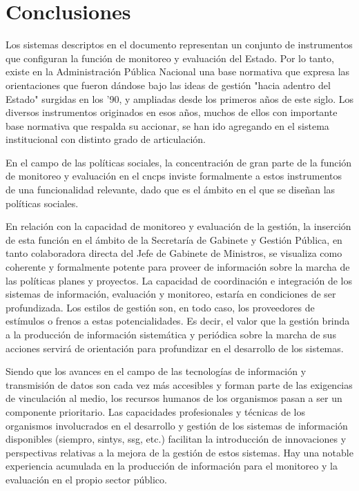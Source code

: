 \newpage
\section{Conclusiones} \label{conclusiones}

Los sistemas descriptos en el documento representan un conjunto de instrumentos que configuran la función de monitoreo y evaluación del Estado. Por lo tanto, existe en la Administración Pública Nacional una base normativa que expresa las orientaciones que fueron dándose bajo las ideas de gestión "hacia adentro del Estado" surgidas en los '90, y ampliadas desde los primeros años de este siglo. Los diversos instrumentos originados en esos años, muchos de ellos con importante base normativa que respalda su accionar, se han ido agregando en el sistema institucional con distinto grado de articulación.

En el campo de las políticas sociales, la concentración de gran parte de la función de monitoreo y evaluación en el \ac{cncps} inviste formalmente a estos instrumentos de una funcionalidad relevante, dado que es el ámbito en el que se diseñan las políticas sociales. 

En relación con la capacidad de monitoreo y evaluación de la gestión, la inserción de esta función en el ámbito de la Secretaría de Gabinete y Gestión Pública, en tanto colaboradora directa del Jefe de Gabinete de Ministros, se visualiza como coherente y formalmente potente para proveer de información sobre la marcha de las políticas planes y proyectos.
La capacidad de coordinación e integración de los sistemas de información, evaluación y monitoreo, estaría en condiciones de ser profundizada. Los estilos de gestión son, en todo caso, los proveedores de estímulos o frenos a estas potencialidades. Es decir, el valor que la gestión brinda a la producción de información sistemática y periódica sobre la marcha de sus acciones servirá de orientación para profundizar en el desarrollo de los sistemas.

Siendo que los avances en el campo de las tecnologías de información y transmisión de datos son cada vez más accesibles y forman parte de las exigencias de vinculación al medio, los recursos humanos de los organismos pasan a ser un componente prioritario. Las capacidades profesionales y técnicas de los organismos involucrados en el desarrollo y gestión de los sistemas de información disponibles (\ac{siempro}, \ac{sintys}, \ac{ssg}, etc.) facilitan la introducción de innovaciones y perspectivas relativas a la mejora de la gestión de estos sistemas. Hay una notable experiencia acumulada en la producción de información para el monitoreo y la evaluación en el propio sector público.

